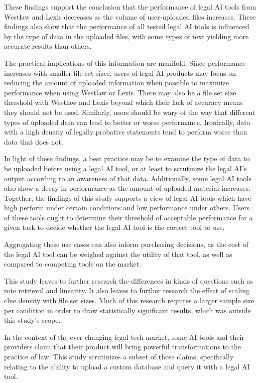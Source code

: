 \documentclass[
]{article}
\begin{document}
These findings support the conclusion that the performance of legal AI tools from Westlaw and Lexis decreases as the volume of user-uploaded files increases. These findings also show that the performance of all tested legal AI tools is influenced by the type of data in the uploaded files, with some types of text yielding more accurate results than others.

The practical implications of this information are manifold. Since performance increases with smaller file set sizes, users of legal AI products may focus on reducing the amount of uploaded information when possible to maximize performance when using Westlaw or Lexis. There may also be a file set size threshold with Westlaw and Lexis beyond which their lack of accuracy means they should not be used. Similarly, users should be wary of the way that different types of uploaded data can lead to better or worse performance. Ironically, data with a high density of legally probative statements tend to perform worse than data that does not.

In light of these findings, a best practice may be to examine the type of data to be uploaded before using a legal AI tool, or at least to scrutinize the legal AI's output according to an awareness of that data. Additionally, some legal AI tools also show a decay in performance as the amount of uploaded material increases. Together, the findings of this study supports a view of legal AI tools which have high perform under certain conditions and low performance under others. Users of these tools ought to determine their threshold of acceptable performance for a given task to decide whether the legal AI tool is the correct tool to use.

Aggregating these use cases can also inform purchasing decisions, as the cost of the legal AI tool can be weighed against the utility of that tool, as well as compared to competing tools on the market.

This study leaves to further research the differences in kinds of questions such as rote retrieval and linearity. It also leaves to further research the effect of scaling clue density with file set sizes. Much of this research requires a larger sample size per condition in order to draw statistically significant results, which was outside this study's scope.

In the context of the ever-changing legal tech market, some AI tools and their providers claim that their product will bring powerful transformations to the practice of law. This study scrutinizes a subset of those claims, specifically relating to the ability to upload a custom database and query it with a legal AI tool.
\end{document}

